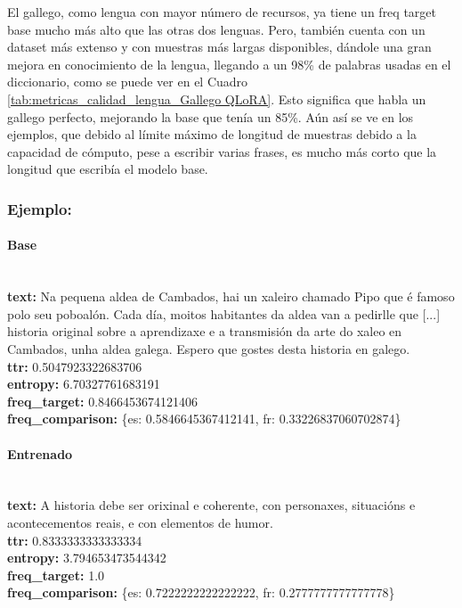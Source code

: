 El gallego, como lengua con mayor número de recursos, ya tiene un freq target base mucho más alto que las otras dos lenguas. Pero, también cuenta con un dataset más extenso y con muestras más largas disponibles, dándole una gran mejora en conocimiento de la lengua, llegando a un 98\% de palabras usadas en el diccionario, como se puede ver en el Cuadro \ref{tab:metricas_calidad_lengua_Gallego QLoRA}. Esto significa que habla un gallego perfecto, mejorando la base que tenía un 85\%.
Aún así se ve en los ejemplos, que debido al límite máximo de longitud de muestras debido a la capacidad de cómputo, pese a escribir varias frases, es mucho más corto que la longitud que escribía el modelo base.

\subsubsection{Ejemplo:}

\paragraph{Base}~\\
\textbf{text:} Na pequena aldea de Cambados, hai un xaleiro chamado Pipo que é famoso polo seu poboalón. Cada día, moitos habitantes da aldea van a pedirlle que  [...] historia original sobre a aprendizaxe e a transmisión da arte do xaleo en Cambados, unha aldea galega. Espero que gostes desta historia en galego.\\
\textbf{ttr:} 0.5047923322683706\\
\textbf{entropy:} 6.70327761683191\\
\textbf{freq\_target:} 0.8466453674121406\\
\textbf{freq\_comparison:} \{\textquotesingle{}es\textquotesingle{}: 0.5846645367412141, \textquotesingle{}fr\textquotesingle{}: 0.33226837060702874\}

\paragraph{Entrenado}~\\
\textbf{text:} A historia debe ser orixinal e coherente, con personaxes, situacións e acontecementos reais, e con elementos de humor.\\
\textbf{ttr:} 0.8333333333333334\\
\textbf{entropy:} 3.794653473544342\\
\textbf{freq\_target:} 1.0\\
\textbf{freq\_comparison:} \{\textquotesingle{}es\textquotesingle{}: 0.7222222222222222, \textquotesingle{}fr\textquotesingle{}: 0.2777777777777778\}

